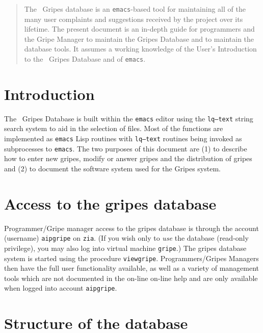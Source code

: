 \normalstyle

\vskip 29pt
\begin{abstract}
The \AIPS\ Gripes database is an {\tt emacs}-based tool for
maintaining all of the many user complaints and suggestions received
by the project over its lifetime.  The present document is an in-depth
guide for programmers and the Gripe Manager to maintain the Gripes
Database and to maintain the database tools. It assumes a working
knowledge of the User's Introduction to the \AIPS\ Gripes Database and
of {\tt emacs}.
\end{abstract}

\renewcommand{\floatpagefraction}{0.75}
\typeout{totalnumber = \arabic{totalnumber} \textfraction\ \floatpagefraction}


\section{Introduction}

The \AIPS\ Gripes Database is built within the {\tt emacs} editor
using the {\tt lq--text} string search system to aid in the selection
of files.  Most of the functions are implemented as {\tt emacs} Lisp
routines with {\tt lq--text} routines being invoked as subprocesses to
{\tt emacs}.  The two purposes of this document are (1) to describe
how to enter new gripes, modify or answer gripes and the distribution
of gripes and (2) to document the software system used for the Gripes
system.

\section{Access to the gripes database}

Programmer/Gripe manager access to the gripes database is through the
account (username) {\tt aipgripe} on {\tt zia}.  (If you wish only to
{\it use} the database (read-only privilege), you may also log into
virtual machine {\tt gripe}.) The gripes database system is started
using the procedure {\tt viewgripe}.  Programmers/Gripes Managers then
have the full user functionality available, as well as a variety of
management tools which are not documented in the on-line on-line help
and are only available when logged into account {\tt aipgripe}.

\section{Structure of the database}

